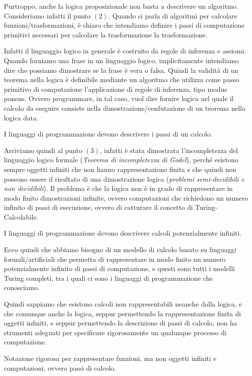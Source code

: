 \documentclass[oneside,a4paper,11pt]{book}
\theoremstyle{italicstyle}
\theoremstyle{normStyle}
\begin{document}
Purtroppo, anche la logica proposizionale non basta a descrivere un algoritmo. 
Consideriamo infatti il punto $(2)$. Quando si parla di algoritmi per calcolare 
funzioni/trasformazioni, è chiaro che intendiamo definire i passi di computazione primitivi 
necessari per calcolare la trasformazione la trasformazione.

Infatti il linguaggio logico in generale è costruito da regole di 
inferenza e assiomi. Quando forniamo una frase in un linguaggio logico, 
implicitamente intendiamo dire che possiamo dimostrare se la frase è vera o 
falsa. Quindi la validità di un teorema nella logica è definibile 
mediante un algoritmo che utilizza come passo primitivo di computazione 
l'applicazione di regole di inferenza, tipo modus ponens. Ovvero programmare, 
in tal caso, vuol dire fornire logica nel quale il calcolo da eseguire consiste 
nella dimostrazione/confutazione di un teorema nella logica data.
\begin{tcolorbox}
  I linguaggi di programmazione devono descrivere i passi di un calcolo.
\end{tcolorbox}

Arriviamo quindi al punto $(3)$, infatti è stata dimostrata l'incompletezza 
del linguaggio logico formale (\textit{Teorema di incompletezza di 
Godel}), perché esistono sempre oggetti infiniti che non hanno rappresentazione 
finita e che quindi non possono essere il risultato di una dimostrazione 
logica (\textit{problemi semi-decidibili e non decidibili}).
Il problema è che la logica non è in grado di rappresentare in modo finito 
dimostrazioni infinite, ovvero computazioni che richiedono un numero 
infinito di passi di esecuzione, ovvero di catturare il concetto di Turing-Calcolabile.

\begin{tcolorbox}
I linguaggi di programmazione devono descrivere calcoli potenzialmente
infiniti.
\end{tcolorbox}

Ecco quindi che abbiamo bisogno di un modello di calcolo basato su linguaggi 
formali/artificiali che permetta di rappresentare in modo finito un 
numero potenzialmente infinito di passi di computazione, e questi sono 
tutti i modelli Turing completi, tra i quali ci sono i linguaggi di programmazione 
che conosciamo.

Quindi sappiamo che esistono calcoli non rappresentabili neanche dalla logica, 
e che comunque anche la logica, seppur permettendo la rappresentazione 
finita di oggetti infiniti, e seppur permettendo la descrizione di passi di 
calcolo, non ha strumenti adeguati per specificare rigorosamente un 
qualunque processo di computazione.
\begin{tcolorbox}[title={Linguaggio Matematico}]
  Notazione rigorosa per rappresentare funzioni, ma non oggetti infiniti 
  e computazioni, ovvero passi di calcolo.
\end{tcolorbox}
\end{document}
